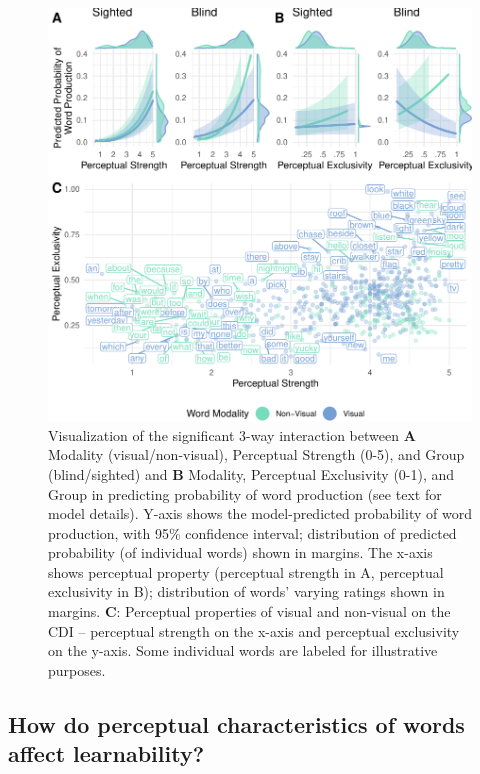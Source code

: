 \documentclass[
  man,floatsintext]{apa6}
\begin{document}
\begin{figure}
\centering
\includegraphics{VI_CDI_manuscript_files/figure-latex/visualornot-1.pdf}
\caption{\label{fig:visualornot}Visualization of the significant 3-way interaction between \textbf{A} Modality (visual/non-visual), Perceptual Strength (0-5), and Group (blind/sighted) and \textbf{B} Modality, Perceptual Exclusivity (0-1), and Group in predicting probability of word production (see text for model details). Y-axis shows the model-predicted probability of word production, with 95\% confidence interval; distribution of predicted probability (of individual words) shown in margins. The x-axis shows perceptual property (perceptual strength in A, perceptual exclusivity in B); distribution of words' varying ratings shown in margins. \textbf{C}: Perceptual properties of visual and non-visual on the CDI -- perceptual strength on the x-axis and perceptual exclusivity on the y-axis. Some individual words are labeled for illustrative purposes.}
\end{figure}

\hypertarget{how-do-perceptual-characteristics-of-words-affect-learnability}{%
\subsection{How do perceptual characteristics of words affect learnability?}\label{how-do-perceptual-characteristics-of-words-affect-learnability}}
\end{document}
